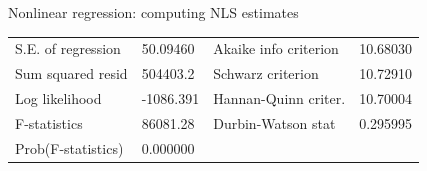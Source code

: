 \documentclass{beamer}
\begin{document}
\begin{frame}{Nonlinear regression: computing NLS estimates}
\begin{table}[]
\begin{tabular}{@{}lllll@{}}
S.E. of regression                                                    & 50.09460                                                      & \multicolumn{2}{l}{Akaike info criterion}                                                                                             & 10.68030                                                   \\
Sum squared resid                                                     & 504403.2                                                      & \multicolumn{2}{l}{Schwarz criterion}                                                                                                 & 10.72910                                                   \\
Log likelihood                                                        & -1086.391                                                     & \multicolumn{2}{l}{Hannan-Quinn criter.}                                                                                              & 10.70004                                                   \\
F-statistics                                                          & 86081.28                                                      & \multicolumn{2}{l}{Durbin-Watson stat}                                                                                                & 0.295995                                                   \\
Prob(F-statistics)                                                    & 0.000000                                                      & \multicolumn{2}{l}{}                                                                                                                  &                                                            \\ \bottomrule
\end{tabular}
\end{table}
\end{frame}
\end{document}
